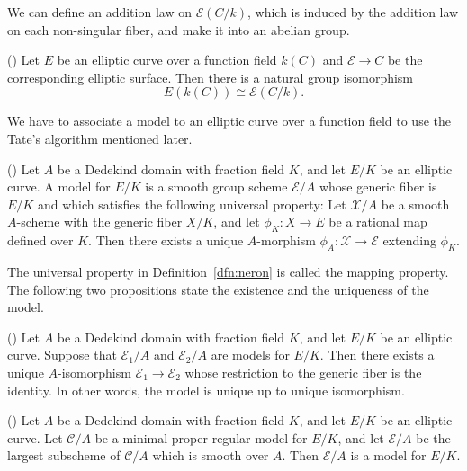 \documentclass[main]{subfiles}
\begin{document}
We can define an addition law on $\mathcal{E}(C/k)$, which is induced by the addition law on each non-singular fiber, and make it into an abelian group.
\begin{prop}{(\cite[Proposition III.3.10. (c)]{ref:advancedaec})}
    Let $E$ be an elliptic curve over a function field $k(C)$ and $\mathcal{E} \to C$ be the corresponding elliptic surface.
    Then there is a natural group isomorphism
    \begin{equation*}
        E(k(C)) \cong \mathcal{E}(C/k).
    \end{equation*}
\end{prop}


We have to associate a \Neron{} model to an elliptic curve over a function field to use the Tate's algorithm mentioned later.

\begin{dfn}{(\cite[IV\S 5 Definition]{ref:advancedaec})}
    \label{dfn:neron}
    Let $A$ be a Dedekind domain with fraction field $K$, and let $E/K$ be an elliptic curve.
    A \Neron{} model for $E/K$ is a smooth group scheme $\mathcal{E}/A$ whose generic fiber is $E/K$ and which satisfies the following universal property:
    Let $\mathcal{X}/A$ be a smooth $A$-scheme with the generic fiber $X/K$, and let $\phi_K: X \to E$ be a rational map defined over $K$.
    Then there exists a unique $A$-morphism $\phi_A: \mathcal{X} \to \mathcal{E}$ extending $\phi_K$.
\end{dfn}
The universal property in Definition~\ref{dfn:neron} is called the \Neron{} mapping property.
The following two propositions state the existence and the uniqueness of the \Neron{} model.
\begin{prop}{(\cite[Proposition IV.5.2. (a)]{ref:advancedaec})}
    Let $A$ be a Dedekind domain with fraction field $K$, and let $E/K$ be an elliptic curve.
    Suppose that $\mathcal{E}_1/A$ and $\mathcal{E}_2/A$ are \Neron{} models for $E/K$.
    Then there exists a unique $A$-isomorphism $\mathcal{E}_1 \to \mathcal{E}_2$ whose restriction to the generic fiber is the identity.
    In other words, the \Neron{} model is unique up to unique isomorphism.
\end{prop}

\begin{prop}{(\cite[Theorem IV.6.1.]{ref:advancedaec})}
    Let $A$ be a Dedekind domain with fraction field $K$, and let $E/K$ be an elliptic curve.
    Let $\mathcal{C}/A$ be a minimal proper regular model for $E/K$, and let $\mathcal{E}/A$ be the largest subscheme of $\mathcal{C}/A$ which is smooth over $A$.
    Then $\mathcal{E}/A$ is a \Neron{} model for $E/K$.
\end{prop}
\end{document}

